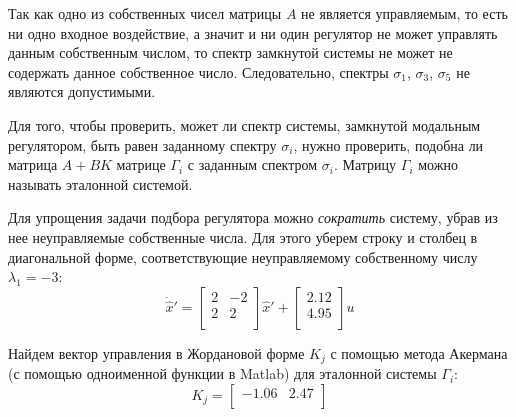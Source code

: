 Так как одно из собственных чисел матрицы $A$ не является управляемым, то есть ни одно входное воздействие, а значит и ни один регулятор 
не может управлять данным собственным числом, то спектр замкнутой системы не может не содержать данное собственное число. 
Следовательно, спектры $\sigma_1$, $\sigma_3$, $\sigma_5$ не являются допустимыми.

Для того, чтобы проверить, может ли спектр системы, замкнутой модальным регулятором, быть равен заданному спектру $\sigma_i$, 
нужно проверить, подобна ли матрица $A + BK$ матрице $\Gamma_i$ с заданным спектром $\sigma_i$.
Матрицу $\Gamma_i$ можно называть эталонной системой.

Для упрощения задачи подбора регулятора можно \textit{сократить} систему, убрав из нее неуправляемые собственные числа. 
Для этого уберем строку и столбец в диагональной форме, соответствующие неуправляемому собственному числу $\lambda_1 = -3$:
\begin{equation}
    \dot{\hat{x}}' =
     \begin{bmatrix}
        2  & -2 \\ 
        2  & 2 \\
    \end{bmatrix} \hat{x}' + 
    \begin{bmatrix}
        2.12 \\ 
        4.95 \\ 
    \end{bmatrix}u
\end{equation}

Найдем вектор управления в Жордановой форме $K_j$ с помощью метода Акермана (с помощью одноименной функции в Matlab) для эталонной системы $\Gamma_i$: 
\begin{equation}
    K_j = \begin{bmatrix}
        -1.06  & 2.47 \\ 
    \end{bmatrix}
\end{equation}

